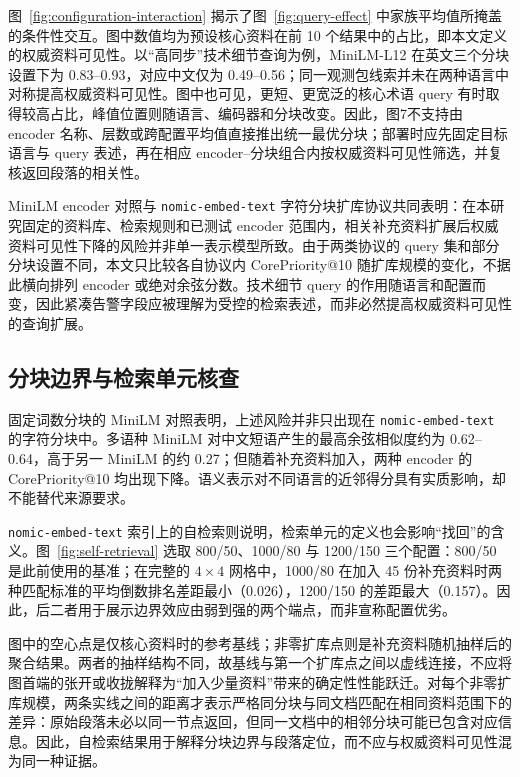 图~\ref{fig:configuration-interaction} 揭示了图~\ref{fig:query-effect} 中家族平均值所掩盖的条件性交互。图中数值均为预设核心资料在前 10 个结果中的占比，即本文定义的权威资料可见性。以“高同步”技术细节查询为例，MiniLM-L12 在英文三个分块设置下为 0.83--0.93，对应中文仅为 0.49--0.56；同一观测包线索并未在两种语言中对称提高权威资料可见性。图中也可见，更短、更宽泛的核心术语 query 有时取得较高占比，峰值位置则随语言、编码器和分块改变。因此，图7不支持由 encoder 名称、层数或跨配置平均值直接推出统一最优分块；部署时应先固定目标语言与 query 表述，再在相应 encoder--分块组合内按权威资料可见性筛选，并复核返回段落的相关性。

MiniLM encoder 对照与 \texttt{nomic-embed-text} 字符分块扩库协议共同表明：在本研究固定的资料库、检索规则和已测试 encoder 范围内，相关补充资料扩展后权威资料可见性下降的风险并非单一表示模型所致。由于两类协议的 query 集和部分分块设置不同，本文只比较各自协议内 CorePriority@10 随扩库规模的变化，不据此横向排列 encoder 或绝对余弦分数。技术细节 query 的作用随语言和配置而变，因此紧凑告警字段应被理解为受控的检索表述，而非必然提高权威资料可见性的查询扩展。

\subsection{分块边界与检索单元核查}

固定词数分块的 MiniLM 对照表明，上述风险并非只出现在 \texttt{nomic-embed-text} 的字符分块中。多语种 MiniLM 对中文短语产生的最高余弦相似度约为 0.62--0.64，高于另一 MiniLM 的约 0.27；但随着补充资料加入，两种 encoder 的 CorePriority@10 均出现下降。语义表示对不同语言的近邻得分具有实质影响，却不能替代来源要求。

\texttt{nomic-embed-text} 索引上的自检索则说明，检索单元的定义也会影响“找回”的含义。图~\ref{fig:self-retrieval} 选取 800/50、1000/80 与 1200/150 三个配置：800/50 是此前使用的基准；在完整的 $4\times4$ 网格中，1000/80 在加入 45 份补充资料时两种匹配标准的平均倒数排名差距最小（0.026），1200/150 的差距最大（0.157）。因此，后二者用于展示边界效应由弱到强的两个端点，而非宣称配置优劣。

图中的空心点是仅核心资料时的参考基线；非零扩库点则是补充资料随机抽样后的聚合结果。两者的抽样结构不同，故基线与第一个扩库点之间以虚线连接，不应将图首端的张开或收拢解释为“加入少量资料”带来的确定性性能跃迁。对每个非零扩库规模，两条实线之间的距离才表示严格同分块与同文档匹配在相同资料范围下的差异：原始段落未必以同一节点返回，但同一文档中的相邻分块可能已包含对应信息。因此，自检索结果用于解释分块边界与段落定位，而不应与权威资料可见性混为同一种证据。

